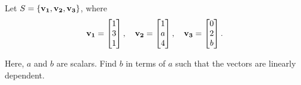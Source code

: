 \question

Let $S = \{\bm{\mathrm{v_1}}, \bm{\mathrm{v_2}}, \bm{\mathrm{v_3}}\}$, where
\[
    \bm{\mathrm{v_1}} = \begin{bmatrix} 1 \\ 3 \\ 1 \end{bmatrix}, \quad
    \bm{\mathrm{v_2}} = \begin{bmatrix} 1 \\ a \\ 4 \end{bmatrix}, \quad
    \bm{\mathrm{v_3}} = \begin{bmatrix} 0 \\ 2 \\ b \end{bmatrix}.
\]

Here, $a$ and $b$ are scalars. Find $b$ in terms of $a$ such that the vectors are linearly dependent.

